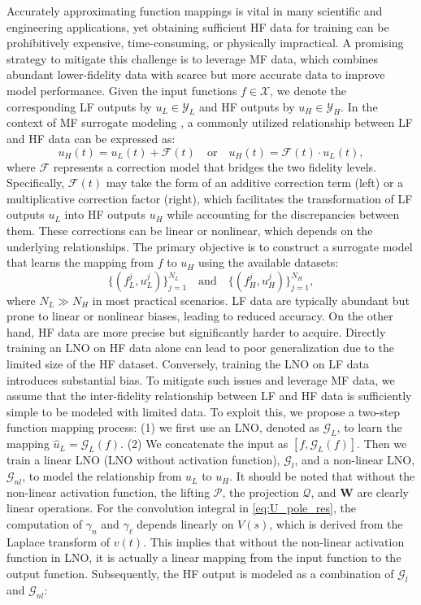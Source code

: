 Accurately approximating function mappings is vital in many scientific and engineering applications, yet obtaining sufficient HF data for training can be prohibitively expensive, time-consuming, or physically impractical. A promising strategy to mitigate this challenge is to leverage MF data, which combines abundant lower-fidelity data with scarce but more accurate data to improve model performance. Given the input functions $f \in \mathcal{X}$, we denote the corresponding LF outputs by $u_L \in \mathcal{Y}_L$ and HF outputs by $u_H \in \mathcal{Y}_H$. In the context of MF surrogate modeling \cite{fernandez2016review}, a commonly utilized relationship between LF and HF data can be expressed as:
\begin{equation}
    u_H(t) = u_L(t) + \mathcal{F}(t) \quad \text{or} \quad u_H(t) = \mathcal{F}(t) \cdot u_L(t),
\end{equation}
where $\mathcal{F}$ represents a correction model that bridges the two fidelity levels. Specifically, $\mathcal{F}(t)$ may take the form of an additive correction term (left) or a multiplicative correction factor (right), which facilitates the transformation of LF outputs $u_L$ into HF outputs $u_H$ while accounting for the discrepancies between them. These corrections can be linear or nonlinear, which depends on the underlying relationships. The primary objective is to construct a surrogate model that learns the mapping from $f$ to $u_H$ using the available datasets:
\begin{equation*}
\{ (f_L^j, u_L^j) \}_{j=1}^{N_L}
\quad
\text{and}
\quad
\{ (f_H^j, u_H^j) \}_{j=1}^{N_H},
\end{equation*}
where $N_L \gg N_H$ in most practical scenarios. LF data are typically abundant but prone to linear or nonlinear biases, leading to reduced accuracy. On the other hand, HF data are more precise but significantly harder to acquire. Directly training an LNO on HF data alone can lead to poor generalization due to the limited size of the HF dataset. Conversely, training the LNO on LF data introduces substantial bias. To mitigate such issues and leverage MF data, we assume that the inter-fidelity relationship between LF and HF data is sufficiently simple to be modeled with limited data. To exploit this, we propose a two-step function mapping process: (1) we first use an LNO, denoted as $\mathcal{G}_{L}$, to learn the mapping $\hat u_L=\mathcal{G}_{L}(f)$. (2) We concatenate the input as $\left[f, \mathcal{G}_{L}(f)\right]$. Then we train a linear LNO (LNO without activation function), $\mathcal{G}_l$, and a non-linear LNO, $\mathcal{G}_{nl}$, to model the relationship from $u_L$ to $u_H$. It should be noted that without the non-linear activation function, the lifting $\mathcal P$, the projection $\mathcal Q$, and $\mathbf{W}$ are clearly linear operations. For the convolution integral in \eqref{eq:U_pole_res}, the computation of $\gamma_n$ and $\gamma_\ell$ depends linearly on $V(s)$, which is derived from the Laplace transform of $v(t)$. This implies that without the non-linear activation function in LNO, it is actually a linear mapping from the input function to the output function. Subsequently, the HF output is modeled as a combination of $\mathcal{G}_l$ and $\mathcal{G}_{nl}$:
